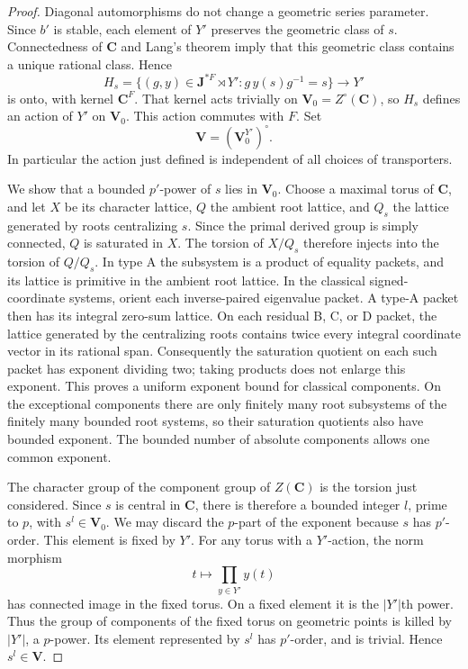 \begin{proof}
Diagonal automorphisms do not change a geometric series parameter.
Since $b'$ is stable, each element of $Y'$ preserves the geometric
class of $s$.  Connectedness of $\mathbf C$ and Lang's theorem imply
that this geometric class contains a unique rational class.  Hence
\[
 H_s=\{(g,y)\in\mathbf J^{*F}\rtimes Y':
                         g\,y(s)g^{-1}=s\}
       \longrightarrow Y'
\]
is onto, with kernel $\mathbf C^F$.  That kernel acts trivially on
$\mathbf V_0=Z^\circ(\mathbf C)$, so $H_s$ defines an action of $Y'$
on $\mathbf V_0$.  This action commutes with $F$.  Set
\[
 \mathbf V=(\mathbf V_0^{Y'})^\circ.
\]
In particular the action just defined is independent of all choices
of transporters.

We show that a bounded $p'$-power of $s$ lies in $\mathbf V_0$.
Choose a maximal torus of $\mathbf C$, and let $X$ be its character
lattice, $Q$ the ambient root lattice, and $Q_s$ the lattice generated
by roots centralizing $s$.  Since the primal derived group is simply
connected, $Q$ is saturated in $X$.  The torsion of $X/Q_s$ therefore
injects into the torsion of $Q/Q_s$.  In type A the subsystem is a
product of equality packets, and its lattice is primitive in the
ambient root lattice.  In the classical signed-coordinate systems,
orient each inverse-paired eigenvalue packet.  A type-A packet then
has its integral zero-sum lattice.  On each residual B, C, or D
packet, the lattice generated by the centralizing roots contains
twice every integral coordinate vector in its rational span.
Consequently the saturation quotient on each such packet has
exponent dividing two; taking products does not enlarge this
exponent.  This proves a uniform exponent bound for classical
components.  On the exceptional components there are only finitely
many root subsystems of the finitely many bounded root systems, so
their saturation quotients also have bounded exponent.  The bounded
number of absolute components allows one common exponent.

The character group of the component group of $Z(\mathbf C)$ is
the torsion just considered.  Since $s$ is central in $\mathbf C$,
there is therefore a bounded integer $l$, prime to $p$, with
$s^l\in\mathbf V_0$.  We may discard the $p$-part of the exponent
because $s$ has $p'$-order.  This element is fixed by $Y'$.
For any torus with a $Y'$-action, the norm morphism
\[
 t\longmapsto\prod_{y\in Y'}y(t)
\]
has connected image in the fixed torus.  On a fixed element it is
the $|Y'|$th power.  Thus the group of components of the fixed torus
on geometric points is killed by $|Y'|$, a $p$-power.  Its element
represented by $s^l$ has $p'$-order, and is trivial.  Hence
$s^l\in\mathbf V$.


\end{proof}
